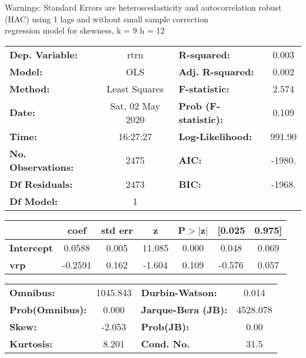 Warnings: \newline
 [1] Standard Errors are heteroscedasticity and autocorrelation robust (HAC) using 1 lags and without small sample correction\\ 

regression model for skewness, k = 9 h = 12\begin{center}
\begin{tabular}{lclc}
\toprule
\textbf{Dep. Variable:}    &       rtrn       & \textbf{  R-squared:         } &     0.003   \\
\textbf{Model:}            &       OLS        & \textbf{  Adj. R-squared:    } &     0.002   \\
\textbf{Method:}           &  Least Squares   & \textbf{  F-statistic:       } &     2.574   \\
\textbf{Date:}             & Sat, 02 May 2020 & \textbf{  Prob (F-statistic):} &    0.109    \\
\textbf{Time:}             &     16:27:27     & \textbf{  Log-Likelihood:    } &    991.90   \\
\textbf{No. Observations:} &        2475      & \textbf{  AIC:               } &    -1980.   \\
\textbf{Df Residuals:}     &        2473      & \textbf{  BIC:               } &    -1968.   \\
\textbf{Df Model:}         &           1      & \textbf{                     } &             \\
\bottomrule
\end{tabular}
\begin{tabular}{lcccccc}
                   & \textbf{coef} & \textbf{std err} & \textbf{z} & \textbf{P$> |$z$|$} & \textbf{[0.025} & \textbf{0.975]}  \\
\midrule
\textbf{Intercept} &       0.0588  &        0.005     &    11.085  &         0.000        &        0.048    &        0.069     \\
\textbf{vrp}       &      -0.2591  &        0.162     &    -1.604  &         0.109        &       -0.576    &        0.057     \\
\bottomrule
\end{tabular}
\begin{tabular}{lclc}
\textbf{Omnibus:}       & 1045.843 & \textbf{  Durbin-Watson:     } &    0.014  \\
\textbf{Prob(Omnibus):} &   0.000  & \textbf{  Jarque-Bera (JB):  } & 4528.078  \\
\textbf{Skew:}          &  -2.053  & \textbf{  Prob(JB):          } &     0.00  \\
\textbf{Kurtosis:}      &   8.201  & \textbf{  Cond. No.          } &     31.5  \\
\bottomrule
\end{tabular}
\end{center}

